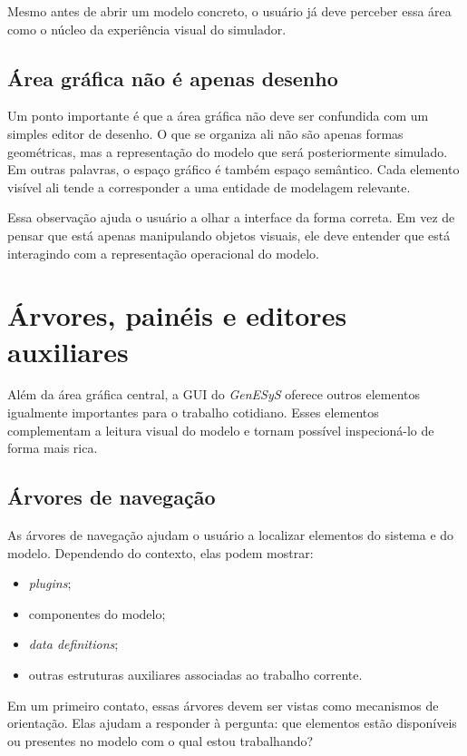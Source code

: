 Mesmo antes de abrir um modelo concreto, o usuário já deve perceber essa área como o núcleo da experiência visual do simulador.

\subsection{Área gráfica não é apenas desenho}
\label{subsec:cap3_area_grafica_nao_apenas_desenho}

Um ponto importante é que a área gráfica não deve ser confundida com um simples editor de desenho. O que se organiza ali não são apenas formas geométricas, mas a representação do modelo que será posteriormente simulado. Em outras palavras, o espaço gráfico é também espaço semântico. Cada elemento visível ali tende a corresponder a uma entidade de modelagem relevante.

Essa observação ajuda o usuário a olhar a interface da forma correta. Em vez de pensar que está apenas manipulando objetos visuais, ele deve entender que está interagindo com a representação operacional do modelo.

\section{Árvores, painéis e editores auxiliares}
\label{sec:cap3_arvores_paineis_editores}

Além da área gráfica central, a GUI do \textit{GenESyS} oferece outros elementos igualmente importantes para o trabalho cotidiano. Esses elementos complementam a leitura visual do modelo e tornam possível inspecioná-lo de forma mais rica.

\subsection{Árvores de navegação}
\label{subsec:cap3_arvores_navegacao}

As árvores de navegação ajudam o usuário a localizar elementos do sistema e do modelo. Dependendo do contexto, elas podem mostrar:
\begin{itemize}
    \item \textit{plugins};
    \item componentes do modelo;
    \item \textit{data definitions};
    \item outras estruturas auxiliares associadas ao trabalho corrente.
\end{itemize}

Em um primeiro contato, essas árvores devem ser vistas como mecanismos de orientação. Elas ajudam a responder à pergunta: que elementos estão disponíveis ou presentes no modelo com o qual estou trabalhando?


